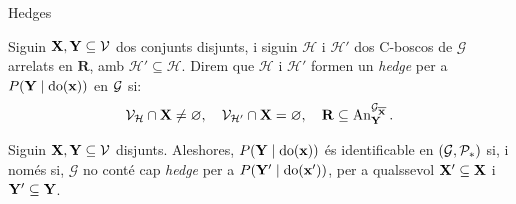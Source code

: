 \documentclass{bestbeamer}
\begin{document}
\begin{frame}{Hedges}\label{frame:hedges}
\begin{definition}\label{def:hedges}
Siguin $\mathbf{X}, \mathbf{Y} \subseteq \mathcal{V}$ dos conjunts disjunts, i siguin $\mathcal{H}$ i $\mathcal{H}'$ dos C-boscos de $\mathcal{G}$ arrelats en $\mathbf{R}$, amb $\mathcal{H}'\subseteq\mathcal{H}$. Direm que $\mathcal{H}$ i $\mathcal{H}'$ formen un \emph{hedge} per a $P(\mathbf{Y}\mid \operatorname{do}(\mathbf{x}))$ en $\mathcal{G}$ si:
\begin{equation*}
\mathcal{V}_{\mathcal{H}} \cap \mathbf{X} \neq \varnothing, \quad \mathcal{V}_{\mathcal{H}'} \cap \mathbf{X} = \varnothing, \quad \mathbf{R} \subseteq \operatorname{An}_{\mathbf{Y}}^{\mathcal{G}_{\overline{\mathbf{X}}}}.
\end{equation*}
\end{definition}
\begin{theorem}\label{thm:hedges}
Siguin $\mathbf{X}, \mathbf{Y} \subseteq \mathcal{V}$ disjunts. Aleshores, $P(\mathbf{Y}\mid \operatorname{do}(\mathbf{x}))$ és identificable en $(\mathcal{G}, \mathcal{P}_*)$ si, i només si, $\mathcal{G}$ no conté cap \emph{hedge} per a $P(\mathbf{Y}'\mid \operatorname{do}(\mathbf{x}'))$, per a qualssevol $\mathbf{X}' \subseteq \mathbf{X}$ i $\mathbf{Y}' \subseteq \mathbf{Y}$.
\end{theorem}
\vfill
\hfill{}
\end{frame}
\end{document}
